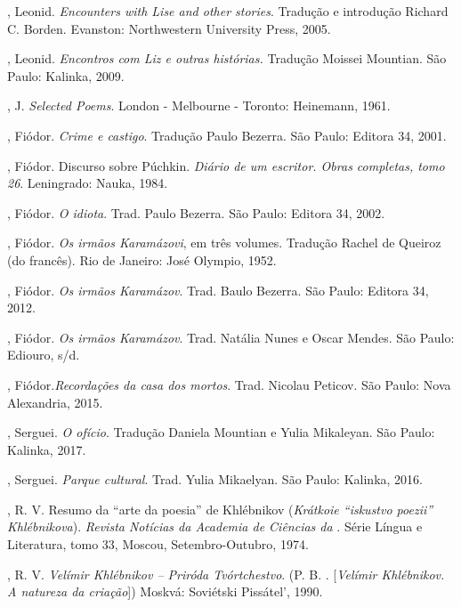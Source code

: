 \begin{Parskip}
, Leonid. \emph{Encounters with Lise and other stories}. Tradução e introdução Richard C. Borden. Evanston: Northwestern University Press, 2005.

, Leonid. \emph{Encontros com Liz e outras histórias.} Tradução Moissei Mountian. São Paulo: Kalinka, 2009.

, J. \emph{Selected Poems}. London - Melbourne - Toronto: Heinemann, 1961.

, Fiódor. \emph{Crime e castigo}. Tradução Paulo Bezerra. São Paulo: Editora 34, 2001.

, Fiódor. Discurso sobre Púchkin. \emph{Diário de um escritor. Obras completas, tomo 26}. Leningrado: Nauka, 1984.

, Fiódor. \emph{O idiota}. Trad. Paulo Bezerra. São Paulo:
Editora 34, 2002.

, Fiódor. \emph{Os irmãos Karamázovi}, em três volumes. Tradução Rachel
de Queiroz (do francês). Rio de Janeiro: José Olympio, 1952.

, Fiódor. \emph{Os irmãos Karamázov}. Trad. Baulo Bezerra.
São Paulo: Editora 34, 2012.

, Fiódor. \emph{Os irmãos Karamázov}. Trad. Natália Nunes e Oscar Mendes. São Paulo: Ediouro, s/d.

, Fiódor.\emph{Recordações da casa dos mortos}. Trad.
Nicolau Peticov. São Paulo: Nova Alexandria, 2015.

, Serguei. \emph{O ofício}. Tradução Daniela Mountian e Yulia Mikaleyan. São Paulo: Kalinka, 2017.

, Serguei. \emph{Parque cultural}. Trad. Yulia Mikaelyan. São Paulo: Kalinka, 2016.

, R. V. Resumo da ``arte da poesia'' de Khlébnikov (\emph{Krátkoie ``iskustvo
poezii'' Khlébnikova}). \emph{Revista Notícias da Academia de Ciências da
}. Série Língua e Literatura, tomo 33, Moscou, Setembro-Outubro,
1974.

, R. V. \emph{Velímir Khlébnikov -- Priróda Tvórtchestvo}. (P. B.
{}.
{[}\emph{Velímir Khlébnikov. A natureza da criação}{]}) Moskvá:
Soviétski Pissátel', 1990.


\end{Parskip}
